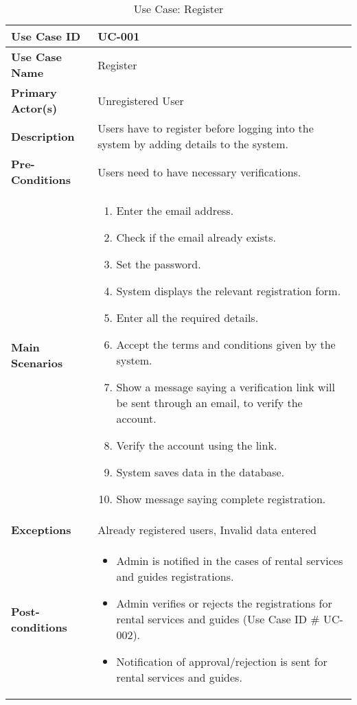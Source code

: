 \begin{table}[!ht]
    \centering
    \begin{tabularx}{\textwidth}{|l|X|}
        \hline
        \textbf{Use Case ID} & UC-001 \\
        \hline
        \textbf{Use Case Name} & Register \\
        \hline
        \textbf{Primary Actor(s)} & Unregistered User \\
        \hline
        \textbf{Description} & Users have to register before logging into the system by adding details to the system. \\
        \hline
        \textbf{Pre-Conditions} & Users need to have necessary verifications. \\
        \hline
        \textbf{Main Scenarios} & 
        \begin{enumerate}[label=\arabic*.,itemsep=0pt]
            \item Enter the email address.
            \item Check if the email already exists.
            \item Set the password.
            \item System displays the relevant registration form.
            \item Enter all the required details.
            \item Accept the terms and conditions given by the system.
            \item Show a message saying a verification link will be sent through an email, to verify the account.
            \item Verify the account using the link.
            \item System saves data in the database.
            \item Show message saying complete registration.
        \end{enumerate} \\
        \hline
        \textbf{Exceptions} & Already registered users, Invalid data entered \\
        \hline
        \textbf{Post-conditions} & 
        \begin{itemize}[label=--,itemsep=0pt]
            \item Admin is notified in the cases of rental services and guides registrations.
            \item Admin verifies or rejects the registrations for rental services and guides (Use Case ID \# UC-002).
            \item Notification of approval/rejection is sent for rental services and guides.
        \end{itemize} \\
        \hline
    \end{tabularx}
    \label{tab:use-case-register}
    \caption{Use Case: Register}
\end{table}


